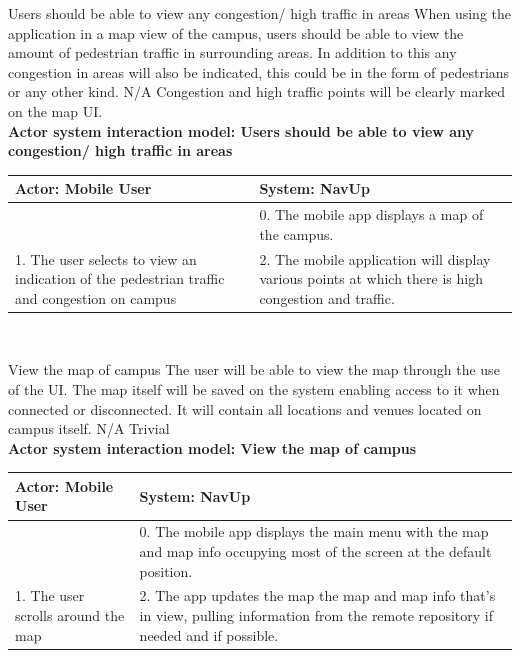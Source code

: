 \FuncReq
{Users should be able to view any congestion/ high traffic in areas}
{When using the application in a map view of the campus, users should be able to view the amount of pedestrian traffic in surrounding areas. In addition to this any congestion in areas will also be indicated, this could be in the form of pedestrians or any other kind.}
{N/A}
{Congestion and high traffic points will be clearly marked on the map UI.}
\bigskip
	\\
    \textbf{Actor system interaction model: Users should be able to view any congestion/ high traffic in areas}\\
    \begin{tabular}{ | p{6cm} | p{6cm} |}
    \hline
    Actor: Mobile User & System: NavUp \\ \hline
    & 0. The mobile app displays a map of the campus.\\ \hline
    1. The user selects to view an indication of the pedestrian traffic and congestion on campus & 2. The mobile application will display various points at which there is high congestion and traffic.\\ \hline
    \end{tabular}
\\
\bigskip

\FuncReq
{View the map of campus}
{The user will be able to view the map through the use of the UI. The map itself will be saved on the system enabling access to it when connected or disconnected. It will contain all locations and venues located on campus itself.}
{N/A}
{Trivial}
    \\
    \textbf{Actor system interaction model: View the map of campus }\\
    \begin{tabular}{ | p{6cm} | p{6cm} |}
    \hline
    Actor: Mobile User & System: NavUp \\ \hline
     & 0. The mobile app displays the main menu with the map and map info occupying most of the screen at the default position.\\ \hline
    1. The user scrolls around the map & 2. The app updates the map the map and map info that's in view, pulling information from the remote repository if needed and if possible.\\ \hline
    
    \end{tabular}
\\
\bigskip

